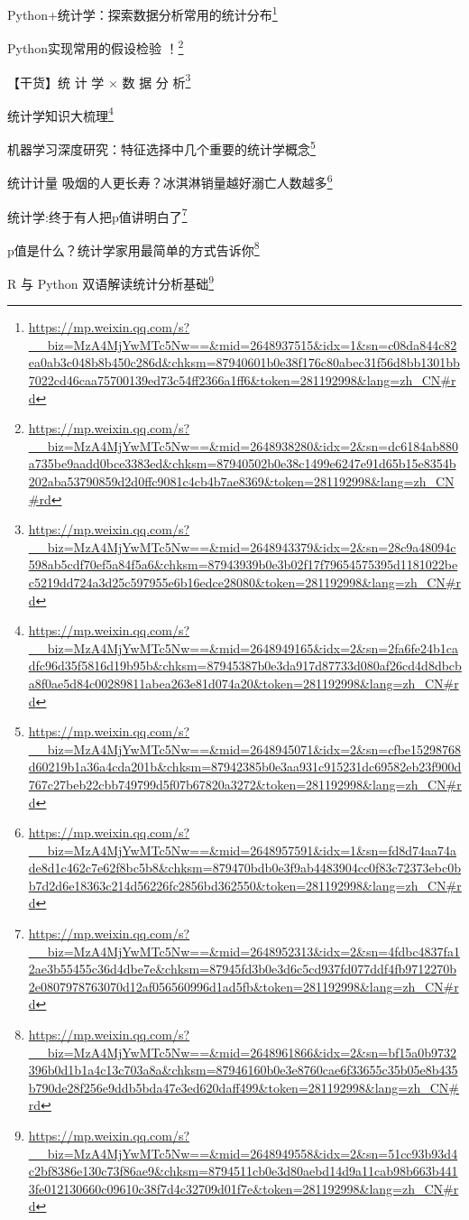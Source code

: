 \documentclass[]{ctexbook}
\renewcommand{\href}[2]{#2\footnote{\url{#1}}}
\begin{document}
\href{https://mp.weixin.qq.com/s?__biz=MzA4MjYwMTc5Nw==\&mid=2648937515\&idx=1\&sn=c08da844c82ea0ab3c048b8b450c286d\&chksm=87940601b0e38f176c80abec31f56d8bb1301bb7022cd46caa75700139ed73c54ff2366a1ff6\&token=281192998\&lang=zh_CN\#rd}{Python+统计学：探索数据分析常用的统计分布}

\href{https://mp.weixin.qq.com/s?__biz=MzA4MjYwMTc5Nw==\&mid=2648938280\&idx=2\&sn=dc6184ab880a735be9aadd0bce3383ed\&chksm=87940502b0e38c1499e6247e91d65b15e8354b202aba53790859d2d0ffc9081c4cb4b7ae8369\&token=281192998\&lang=zh_CN\#rd}{Python实现常用的假设检验 ！}

\href{https://mp.weixin.qq.com/s?__biz=MzA4MjYwMTc5Nw==\&mid=2648943379\&idx=2\&sn=28c9a48094c598ab5cdf70ef5a84f5a6\&chksm=87943939b0e3b02f17f79654575395d1181022bec5219dd724a3d25c597955e6b16edce28080\&token=281192998\&lang=zh_CN\#rd}{【干货】统 计 学 × 数 据 分 析}

\href{https://mp.weixin.qq.com/s?__biz=MzA4MjYwMTc5Nw==\&mid=2648949165\&idx=2\&sn=2fa6fe24b1cadfc96d35f5816d19b95b\&chksm=87945387b0e3da917d87733d080af26cd4d8dbcba8f0ae5d84c00289811abea263e81d074a20\&token=281192998\&lang=zh_CN\#rd}{统计学知识大梳理}

\href{https://mp.weixin.qq.com/s?__biz=MzA4MjYwMTc5Nw==\&mid=2648945071\&idx=2\&sn=cfbe15298768d60219b1a36a4cda201b\&chksm=87942385b0e3aa931c915231dc69582eb23f900d767c27beb22cbb749799d5f07b67820a3272\&token=281192998\&lang=zh_CN\#rd}{机器学习深度研究：特征选择中几个重要的统计学概念}

\href{https://mp.weixin.qq.com/s?__biz=MzA4MjYwMTc5Nw==\&mid=2648957591\&idx=1\&sn=fd8d74aa74ade8d1c462c7e62f8bc5b8\&chksm=879470bdb0e3f9ab4483904cc0f83c72373ebc0bb7d2d6e18363c214d56226fc2856bd362550\&token=281192998\&lang=zh_CN\#rd}{统计计量 \textbar{} 吸烟的人更长寿？冰淇淋销量越好溺亡人数越多}

\href{https://mp.weixin.qq.com/s?__biz=MzA4MjYwMTc5Nw==\&mid=2648952313\&idx=2\&sn=4fdbc4837fa12ae3b55455c36d4dbe7e\&chksm=87945fd3b0e3d6c5cd937fd077ddf4fb9712270b2e0807978763070d12af056560996d1ad5fb\&token=281192998\&lang=zh_CN\#rd}{统计学:终于有人把p值讲明白了}

\href{https://mp.weixin.qq.com/s?__biz=MzA4MjYwMTc5Nw==\&mid=2648961866\&idx=2\&sn=bf15a0b9732396b0d1b1a4c13c703a8a\&chksm=87946160b0e3e8760cae6f33655c35b05e8b435b790de28f256e9ddb5bda47e3ed620daff499\&token=281192998\&lang=zh_CN\#rd}{p值是什么？统计学家用最简单的方式告诉你}

\href{https://mp.weixin.qq.com/s?__biz=MzA4MjYwMTc5Nw==\&mid=2648949558\&idx=2\&sn=51cc93b93d4c2bf8386e130c73f86ae9\&chksm=8794511cb0e3d80aebd14d9a11cab98b663b4413fe012130660c09610c38f7d4c32709d01f7e\&token=281192998\&lang=zh_CN\#rd}{R 与 Python 双语解读统计分析基础}
\end{document}
